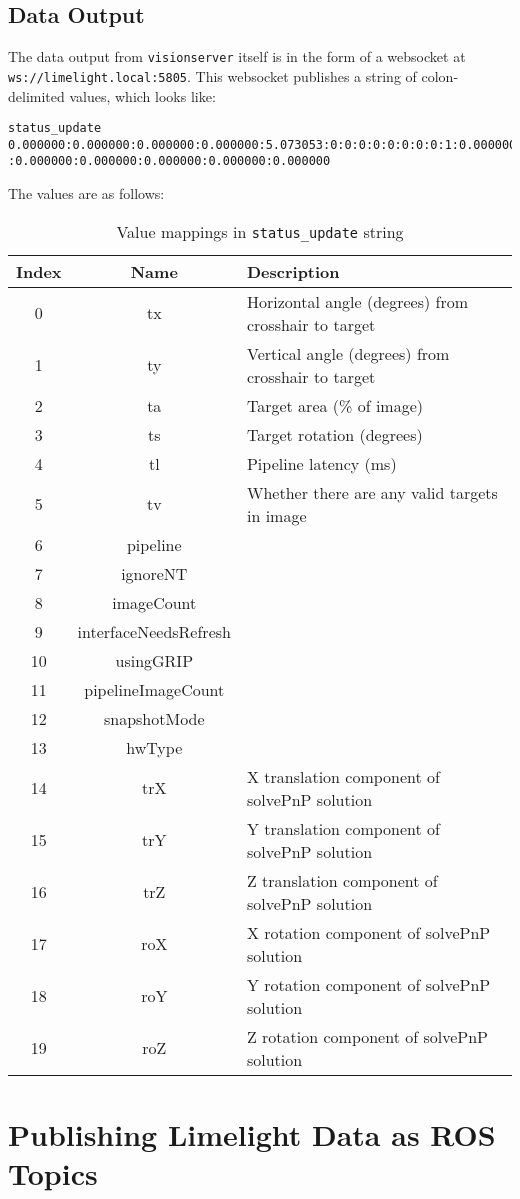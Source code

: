 \documentclass{article}
\begin{document}
\subsection{Data Output}
\par The data output from \texttt{visionserver} itself is in the form of a websocket at \texttt{ws://limelight.local:5805}. This websocket publishes a string of colon-delimited values, which looks like: 
\begin{verbatim}
status_update 0.000000:0.000000:0.000000:0.000000:5.073053:0:0:0:0:0:0:0:0:1:0.000000
:0.000000:0.000000:0.000000:0.000000:0.000000
\end{verbatim}
The values are as follows:
\begin{table}[h!]
	\centering
	\begin{tabular}{|c|c|l|}
		\hline
		\textbf{Index} & \textbf{Name} & \textbf{Description}\\ \hline
		0 & tx & Horizontal angle (degrees) from crosshair to target\\ \hline
		1 & ty & Vertical angle (degrees) from crosshair to target\\ \hline
		2 & ta & Target area (\% of image)\\ \hline
		3 & ts & Target rotation (degrees)\\ \hline
		4 & tl & Pipeline latency (ms)\\ \hline
		5 & tv & Whether there are any valid targets in image\\ \hline
		6 & pipeline & \\ \hline
		7 & ignoreNT & \\ \hline
		8 & imageCount & \\ \hline
		9 & interfaceNeedsRefresh & \\ \hline
		10 & usingGRIP & \\ \hline
		11 & pipelineImageCount & \\ \hline
		12 & snapshotMode & \\ \hline
		13 & hwType & \\ \hline
		14 & trX & X translation component of solvePnP solution\\ \hline
		15 & trY & Y translation component of solvePnP solution \\ \hline
		16 & trZ & Z translation component of solvePnP solution \\ \hline
		17 & roX & X rotation component of solvePnP solution \\ \hline
		18 & roY & Y rotation component of solvePnP solution \\ \hline
		19 & roZ & Z rotation component of solvePnP solution \\ \hline
	\end{tabular}
	\caption{Value mappings in \texttt{status\_update} string}
\end{table}

\section{Publishing Limelight Data as ROS Topics}
\end{document}
